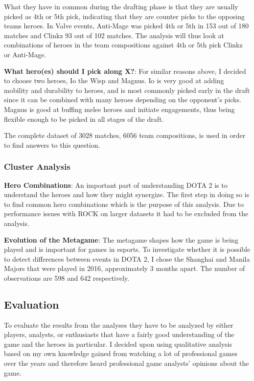 \documentclass[report.tex]{subfiles}
\begin{document}
What they have in common during the drafting phase is that they are usually picked as 4th or 5th pick, indicating that they are counter picks to the opposing teams heroes. In Valve events, Anti-Mage was picked 4th or 5th in 153 out of 180 matches and Clinkz 93 out of 102 matches. The analysis will thus look at combinations of heroes in the team compositions against 4th or 5th pick Clinkz or Anti-Mage.

\textbf{What hero(es) should I pick along X?}: For similar reasons above, I decided to choose two heroes, Io the Wisp and Magnus. Io is very good at adding mobility and durability to heroes, and is most commonly picked early in the draft since it can be combined with many heroes depending on the opponent's picks. Magnus is good at buffing melee heroes and initiate engagements, thus being flexible enough to be picked in all stages of the draft.

The complete dataset of 3028 matches, 6056 team compositions, is used in order to find answers to this question.

\subsubsection*{Cluster Analysis}

\textbf{Hero Combinations}: An important part of understanding DOTA 2 is to understand the heroes and how they might synergize. The first step in doing so is to find common hero combinations which is the purpose of this analysis. Due to performance issues with ROCK on larger datasets it had to be excluded from the analysis.

\textbf{Evolution of the Metagame}: The metagame shapes how the game is being played and is important for games in esports. To investigate whether it is possible to detect differences between events in DOTA 2, I chose the Shanghai and Manila Majors that were played in 2016, approximately 3 months apart. The number of observations are 598 and 642 respectively.

\subsection*{Evaluation}

To evaluate the results from the analyses they have to be analyzed by either players, analysts, or enthusiasts that have a fairly good understanding of the game and the heroes in particular. I decided upon using qualitative analysis based on my own knowledge gained from watching a lot of professional games over the years and therefore heard professional game analysts' opinions about the game.
\end{document}
